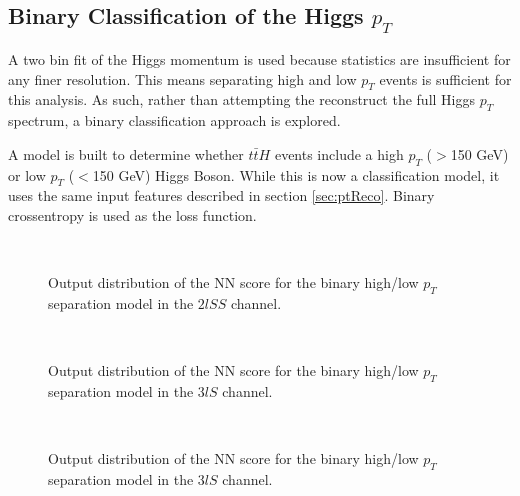 \subsection{Binary Classification of the Higgs $p_T$}
\label{subsec:binPtApx}
                                                                                                                     
A two bin fit of the Higgs momentum is used because statistics are insufficient for any finer resolution. This means separating high and low $p_T$ events is sufficient for this analysis. As such, rather than attempting the reconstruct the full Higgs $p_T$ spectrum, a binary classification approach is explored.

A model is built to determine whether $t\bar{t}H$ events include a high $p_T$ ($>$150 GeV) or low $p_T$ ($<$150 GeV) Higgs Boson. While this is now a classification model, it uses the same input features described in section \ref{sec:ptReco}. Binary crossentropy is used as the loss function.

\begin{figure}[H]                                                                                                           
  \\
  \caption{Output distribution of the NN score for the binary high/low $p_T$ separation model in the $2lSS$ channel.}
  \label{fig:bin2lSSroc}                                                                          
\end{figure}

\begin{figure}[H]
  \\                                
  \caption{Output distribution of the NN score for the binary high/low $p_T$ separation model in the $3lS$ channel.}
  \label{fig:bin3lSroc}
\end{figure} 

\begin{figure}[H]
  \\                                
  \caption{Output distribution of the NN score for the binary high/low $p_T$ separation model in the $3lS$ channel.}
  \label{fig:bin3lFroc}
\end{figure} 

